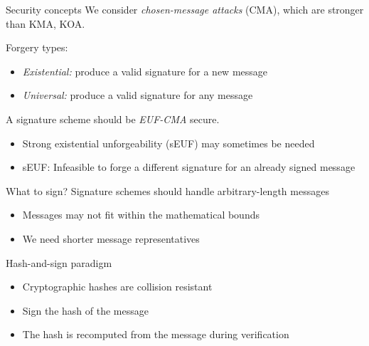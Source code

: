 \begin{frame}{Security concepts}
  We consider \emph{chosen-message attacks} (CMA), which are stronger than KMA, KOA.

  \vspace*{1em}

  \pause
  Forgery types:
  \begin{itemize}[<+(1)->]
    \item \emph{Existential:}
    produce a valid signature for a new message
    \item \emph{Universal:}
    produce a valid signature for any message
  \end{itemize}

  \vspace*{1em}

  \pause
  A signature scheme should be \emph{EUF-CMA} secure.
  \begin{itemize}[<+(1)->]
    \item Strong existential unforgeability (sEUF) may sometimes be needed
    \item sEUF: Infeasible to forge a different signature for an already signed message
  \end{itemize}
\end{frame}

\begin{frame}{What to sign?}
  Signature schemes should handle arbitrary-length messages
  \begin{itemize}[<+(1)->]
    \item Messages may not fit within the mathematical bounds
    \item We need shorter message representatives
  \end{itemize}

  \vspace*{1em}

  \pause
  Hash-and-sign paradigm
  \begin{itemize}[<+(1)->]
    \item Cryptographic hashes are collision resistant
    \item Sign the hash of the message
    \item The hash is recomputed from the message during verification
  \end{itemize}
\end{frame}

